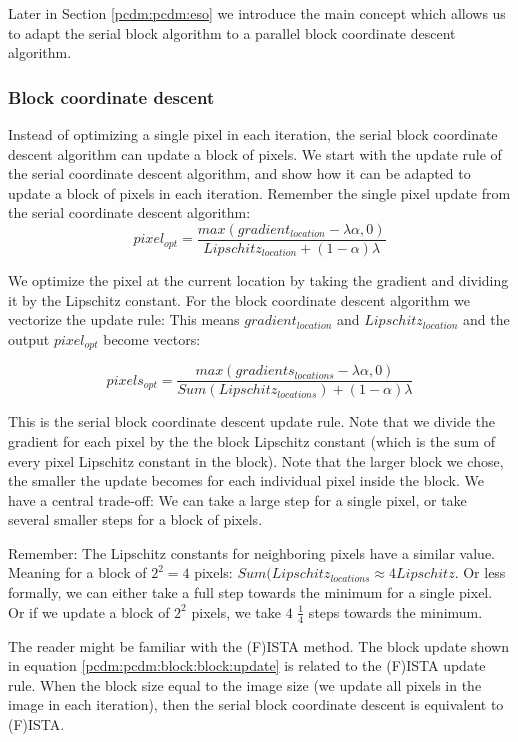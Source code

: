 Later in Section \ref{pcdm:pcdm:eso} we introduce the main concept which allows us to adapt the serial block algorithm to a parallel block coordinate descent algorithm.

\subsubsection{Block coordinate descent}
Instead of optimizing a single pixel in each iteration, the serial block coordinate descent algorithm can update a block of pixels. We start with the update rule of the serial coordinate descent algorithm, and show how it can be adapted to update a block of pixels in each iteration. Remember the single pixel update from the serial coordinate descent algorithm: 
\begin{equation} \label{pcdm:pcdm:block:single:update}
pixel_{opt} = \frac{max(gradient_{location} - \lambda\alpha, 0)}{Lipschitz_{location} + (1 - \alpha)\lambda}
\end{equation}

We optimize the pixel at the current location by taking the gradient and dividing it by the Lipschitz constant. For the block coordinate descent algorithm we vectorize the update rule: This means $gradient_{location}$ and $Lipschitz_{location}$ and the output $pixel_{opt}$ become vectors:

\begin{equation} \label{pcdm:pcdm:block:block:update}
pixels_{opt} = \frac{max(gradients_{locations} - \lambda\alpha, 0)}{Sum(Lipschitz_{locations}) + (1 - \alpha)\lambda}
\end{equation}

This is the serial block coordinate descent update rule. Note that we divide the gradient for each pixel by the the block Lipschitz constant (which is the sum of every pixel Lipschitz constant in the block). Note that the larger block we chose, the smaller the update becomes for each individual pixel inside the block. We have a central trade-off: We can take a large step for a single pixel, or take several smaller steps for a block of pixels. 

Remember: The Lipschitz constants for neighboring pixels have a similar value. Meaning for a block of $2^2 = 4$ pixels: $Sum(Lipschitz_{locations} \approx 4 Lipschitz$. Or less formally, we can either take a full step towards the minimum for a single pixel. Or if we update a block of $2^2$ pixels, we take $4$ $\frac{1}{4}$ steps towards the minimum.

The reader might be familiar with the (F)ISTA method\cite{beck2009fista}. The block update shown in equation \eqref{pcdm:pcdm:block:block:update} is related to the (F)ISTA update rule. When the block size equal to the image size (we update all pixels in the image in each iteration), then the serial block coordinate descent is equivalent to (F)ISTA.

